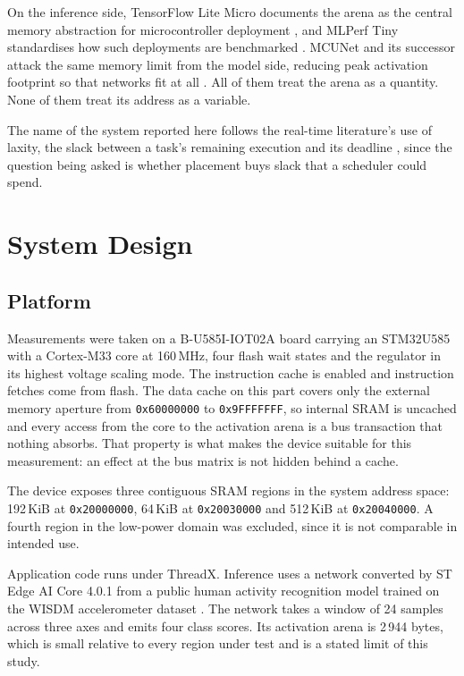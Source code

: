 \documentclass[conference]{IEEEtran}
\begin{document}
On the inference side, TensorFlow Lite Micro documents the arena as the
central memory abstraction for microcontroller deployment
\cite{david2021}, and MLPerf Tiny standardises how such deployments are
benchmarked \cite{banbury2021}. MCUNet and its successor attack the same
memory limit from the model side, reducing peak activation footprint so
that networks fit at all \cite{lin2020,lin2021}. All of them treat the
arena as a quantity. None of them treat its address as a variable.

The name of the system reported here follows the real-time literature's
use of laxity, the slack between a task's remaining execution and its
deadline \cite{liu1973}, since the question being asked is whether
placement buys slack that a scheduler could spend.

\section{System Design}

\subsection{Platform}

Measurements were taken on a B-U585I-IOT02A board carrying an STM32U585
with a Cortex-M33 core at 160\,MHz, four flash wait states and the
regulator in its highest voltage scaling mode. The instruction cache is
enabled and instruction fetches come from flash. The data cache on this
part covers only the external memory aperture from
\texttt{0x60000000} to \texttt{0x9FFFFFFF}, so internal SRAM is uncached
and every access from the core to the activation arena is a bus
transaction that nothing absorbs. That property is what makes the device
suitable for this measurement: an effect at the bus matrix is not hidden
behind a cache.

The device exposes three contiguous SRAM regions in the system address
space: 192\,KiB at \texttt{0x20000000}, 64\,KiB at \texttt{0x20030000}
and 512\,KiB at \texttt{0x20040000}. A fourth region in the low-power
domain was excluded, since it is not comparable in intended use.

Application code runs under ThreadX. Inference uses a network converted
by ST Edge AI Core 4.0.1 from a public human activity recognition model
trained on the WISDM accelerometer dataset \cite{kwapisz2010}. The
network takes a window of 24 samples across three axes and emits four
class scores. Its activation arena is 2\,944 bytes, which is small
relative to every region under test and is a stated limit of this study.
\end{document}
